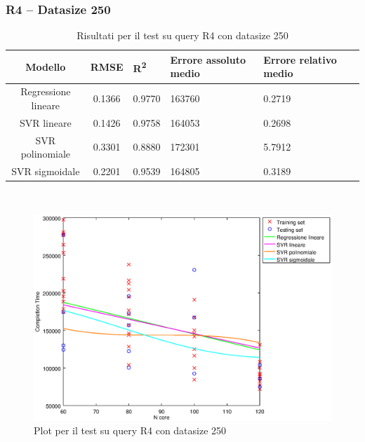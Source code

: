 \documentclass[a4paper,11pt]{article}
\begin{document}
\subsubsection{R4 -- Datasize 250}
\begin{table}[bhpt]
	\centering
	\begin{adjustbox}{center}
		\begin{tabular}{c | c M{1.2cm} M{2.5cm} M{2.5cm} M{1.8cm}}
			Modello & RMSE & R\textsuperscript{2} & Errore assoluto medio & Errore relativo medio \tabularnewline
			\hline
			Regressione lineare & 0.1366 & 0.9770 & 163760 & 0.2719 \\
			SVR lineare & 0.1426 & 0.9758 & 164053 & 0.2698 \\
			SVR polinomiale & 0.3301 & 0.8880 & 172301 & 5.7912 \\
			SVR sigmoidale & 0.2201 & 0.9539 & 164805 & 0.3189 \\
		\end{tabular}
	\end{adjustbox}
	\\
	\caption{Risultati per il test su query R4 con datasize 250}
	\label{table_R4_250}
\end{table}

\begin {figure}[hbtp]
\centering
\includegraphics[width=\textwidth]{output/R4_250/plot_R4_250.eps}
\caption {Plot per il test su query R4 con datasize 250}
\end {figure}
\newpage
\end{document}
